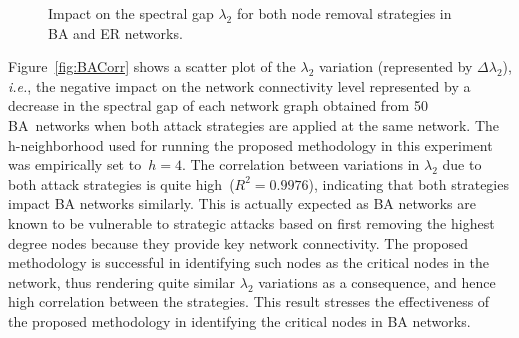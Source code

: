 \documentclass[conference,fleqn]{IEEEtran}
\begin{document}
\begin{figure*}[ht]
 \caption{Impact on the spectral gap $\lambda_2$ for both node removal strategies in BA and ER networks.}
 \label{fig:Corr}
 \end{figure*}
 


Figure~\ref{fig:BACorr} shows a scatter plot of the $\lambda_2$ variation (represented by $\Delta \lambda_2$),
\textit{i.e.}, the negative impact on the network connectivity level represented by a decrease in the spectral gap
of each network graph obtained from 50 BA~networks when both attack strategies are applied at the same network. 
The h-neighborhood used for running the proposed methodology in this experiment was empirically set to~$h=4$.
The correlation between variations in $\lambda_2$ due to both attack strategies is quite high~($R^2=0.9976$), indicating
that both strategies impact BA networks similarly. This is actually expected as BA networks are known to be vulnerable to
strategic attacks based on first removing the highest degree nodes because they provide key network connectivity.
The proposed methodology is successful in identifying such nodes as the critical nodes in the network, thus rendering 
quite similar $\lambda_2$ variations as a consequence, and hence high correlation between the strategies.
This result stresses the effectiveness of the proposed methodology in identifying the critical nodes in BA networks.
\end{document}
